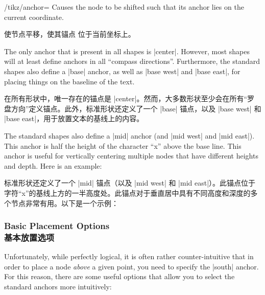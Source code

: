 \begin{key}{/tikz/anchor=}
    Causes the node to be shifted such that its anchor  lies
    on the current coordinate.

    使节点平移，使其锚点  位于当前坐标上。

    The only anchor that is present in all shapes is |center|. However, most
    shapes will at least define anchors in all ``compass directions''.
    Furthermore, the standard shapes also define a |base| anchor, as well as
    |base west| and |base east|, for placing things on the baseline of the
    text.

    在所有形状中，唯一存在的锚点是 |center|。然而，大多数形状至少会在所有“罗盘方向”定义锚点。此外，标准形状还定义了一个 |base| 锚点，以及 |base west| 和 |base east|，用于放置文本的基线上的内容。

    The standard shapes also define a |mid| anchor (and |mid west| and
    |mid east|). This anchor is half the height of the character ``x'' above
    the base line. This anchor is useful for vertically centering multiple
    nodes that have different heights and depth. Here is an example:
    
    标准形状还定义了一个 |mid| 锚点（以及 |mid west| 和 |mid east|）。此锚点位于字符“x”的基线上方的一半高度处。此锚点对于垂直居中具有不同高度和深度的多个节点非常有用。以下是一个示例：

%
\begin{codeexample}[]
\end{codeexample}
\end{key}


\subsubsection{Basic Placement Options\\基本放置选项}

Unfortunately, while perfectly logical, it is often rather counter-intuitive
that in order to place a node \emph{above} a given point, you need to specify
the |south| anchor. For this reason, there are some useful options that allow
you to select the standard anchors more intuitively:

